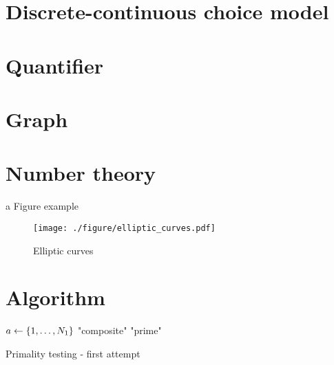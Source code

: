 \section{Discrete-continuous choice model}


\section{Quantifier}
\lipsum %

\section{Graph}
\cite{babaiGraphIsomorphismQuasipolynomial2016}

\section{Number theory}
a Figure example
\begin{figure}[!ht]
    \centering
    \texttt{[image: ./figure/elliptic\_curves.pdf]}
    \caption{Elliptic curves \cite{childsUniversalComputationQuantum2009} }
\end{figure}


\section{Algorithm}
\begin{algorithm}[H]
    \DontPrintSemicolon
    \BlankLine
     {
        $a\leftarrow \qty{1,\dots,N_1}$  
    {\Return "composite"}
    }
    \Return "prime"
    \caption{Primality testing - first attempt}
    \label{alg:miller_rabin}
\end{algorithm}
